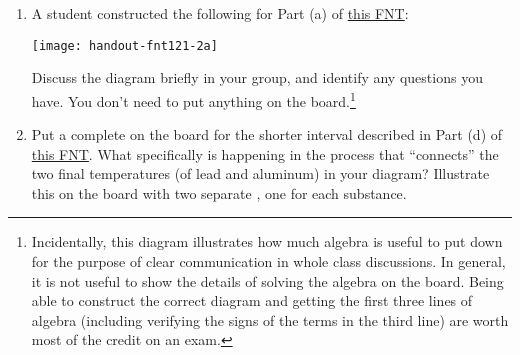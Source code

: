 \begin{enumerate}[1.]
	\item A student constructed the following \EnergyDiagram{} for Part (a) of \hyperref[fnt1.2.1-2]{this FNT}:

	\texttt{[image: handout-fnt121-2a]}
	
	Discuss the diagram briefly in your group, and identify any questions you have. You don't need to put anything on the board.\footnote{Incidentally, this diagram illustrates how much algebra is useful to put down for the purpose of clear communication in whole class discussions. In general, it is not useful to show the details of solving the algebra on the board. Being able to construct the correct diagram and getting the first three lines of algebra (including verifying the signs of the terms in the third line) are worth most of the credit on an exam.}
	
	
	\item Put a complete \EnergyDiagram{} on the board for the shorter interval described in Part (d) of \hyperref[fnt1.2.1-2]{this FNT}. What specifically is happening in the process that ``connects'' the two final temperatures (of lead and aluminum) in your diagram? Illustrate this on the board with two separate \TempGraphs{}, one for each substance.
	
	

\WCD 

\end{enumerate}

